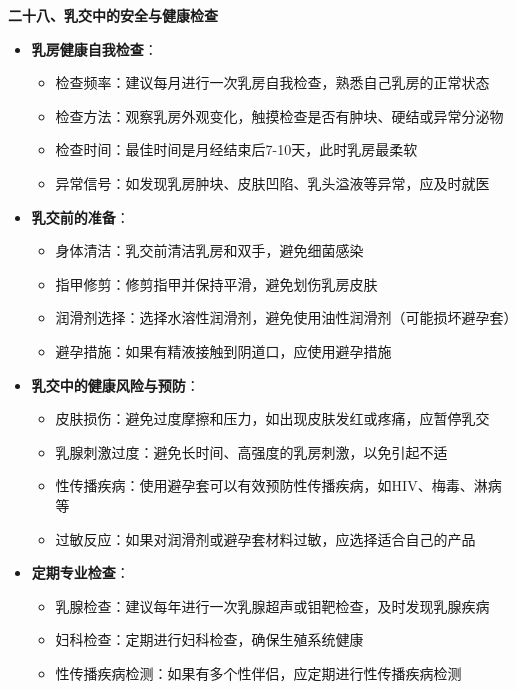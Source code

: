 \documentclass[12pt,UTF8]{ctexbook}
\begin{document}
  \textbf{二十八、乳交中的安全与健康检查}
  \begin{itemize}
  \item \textbf{乳房健康自我检查}：
    \begin{itemize}
    \item 检查频率：建议每月进行一次乳房自我检查，熟悉自己乳房的正常状态
    \item 检查方法：观察乳房外观变化，触摸检查是否有肿块、硬结或异常分泌物
    \item 检查时间：最佳时间是月经结束后7-10天，此时乳房最柔软
    \item 异常信号：如发现乳房肿块、皮肤凹陷、乳头溢液等异常，应及时就医
    \end{itemize}
  \item \textbf{乳交前的准备}：
    \begin{itemize}
    \item 身体清洁：乳交前清洁乳房和双手，避免细菌感染
    \item 指甲修剪：修剪指甲并保持平滑，避免划伤乳房皮肤
    \item 润滑剂选择：选择水溶性润滑剂，避免使用油性润滑剂（可能损坏避孕套）
    \item 避孕措施：如果有精液接触到阴道口，应使用避孕措施
    \end{itemize}
  \item \textbf{乳交中的健康风险与预防}：
    \begin{itemize}
    \item 皮肤损伤：避免过度摩擦和压力，如出现皮肤发红或疼痛，应暂停乳交
    \item 乳腺刺激过度：避免长时间、高强度的乳房刺激，以免引起不适
    \item 性传播疾病：使用避孕套可以有效预防性传播疾病，如HIV、梅毒、淋病等
    \item 过敏反应：如果对润滑剂或避孕套材料过敏，应选择适合自己的产品
    \end{itemize}
  \item \textbf{定期专业检查}：
    \begin{itemize}
    \item 乳腺检查：建议每年进行一次乳腺超声或钼靶检查，及时发现乳腺疾病
    \item 妇科检查：定期进行妇科检查，确保生殖系统健康
    \item 性传播疾病检测：如果有多个性伴侣，应定期进行性传播疾病检测
    \end{itemize}
  \end{itemize}
\end{document}
